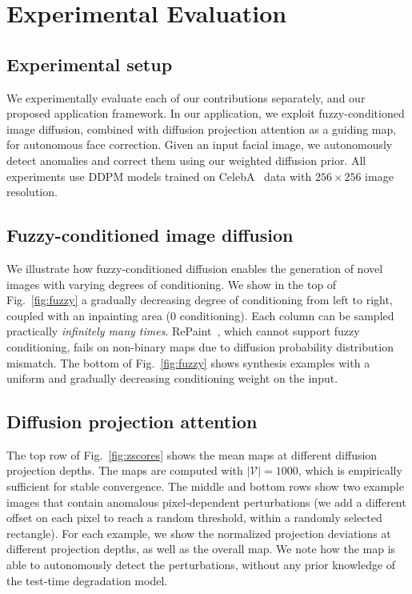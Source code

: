 \documentclass{article}
\begin{document}



\section{Experimental Evaluation}
\subsection{Experimental setup}
We experimentally evaluate each of our contributions separately, and our proposed application framework. In our application, we exploit fuzzy-conditioned image diffusion, combined with diffusion projection attention as a guiding map, for autonomous face correction. Given an input facial image, we autonomously detect anomalies and correct them using our weighted diffusion prior. All experiments use DDPM models trained on CelebA~\cite{liu2015deep} data with $256\times 256$ image resolution. %


\subsection{Fuzzy-conditioned image diffusion}
We illustrate how fuzzy-conditioned diffusion enables the generation of novel images with varying degrees of conditioning. We show in the top of Fig.~\ref{fig:fuzzy} a gradually decreasing degree of conditioning from left to right, coupled with an inpainting area (0 conditioning). Each column can be sampled practically \textit{infinitely many times}. RePaint~\cite{lugmayr2022repaint}, which cannot support fuzzy conditioning, fails on non-binary maps due to diffusion probability distribution mismatch. The bottom of Fig.~\ref{fig:fuzzy} shows synthesis examples with a uniform and gradually decreasing conditioning weight on the input. 


\subsection{Diffusion projection attention}
The top row of Fig.~\ref{fig:zscores} shows the mean maps at different diffusion projection depths. The maps are computed with $|\mathcal{V}|=1000$, which is empirically sufficient for stable convergence. The middle and bottom rows show two example images that contain anomalous pixel-dependent perturbations (we add a different offset on each pixel to reach a random threshold, within a randomly selected rectangle). For each example, we show the normalized projection deviations at different projection depths, as well as the overall map. We note how the map is able to autonomously detect the perturbations, without any prior knowledge of the test-time degradation model.
\end{document}
